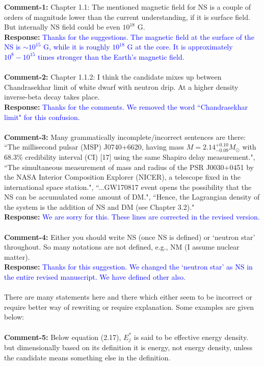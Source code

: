 \documentclass[aps,preprint,showpacs,amsmath,amssymb,prc,floatfix,nofootinbib]{revtex4-1}
\begin{document}
{\bf Comment-1:} Chapter 1.1: The mentioned magnetic field for NS is a couple of orders of magnitude lower than the current understanding, if it is surface field. But internally NS field could be even $10^{18}$ G.
\\
{\bf Response:} \textcolor{blue}{Thanks for the suggestions. The magnetic field at the surface of the NS is $\sim 10^{15}$ G, while it is roughly $10^{18}$ G at the core. It is approximately $10^8-10^{15}$ times stronger than the Earth's magnetic field.}
\\
\\
{\bf Comment-2:} Chapter 1.1.2: I think the candidate mixes up between Chandrasekhar limit of white dwarf with neutron drip. At a higher density inverse-beta decay takes place.
\\
{\bf Response:} \textcolor{blue}{Thanks for the comments. We removed the word ``Chandrasekhar limit" for this confusion.}
\\
\\
{\bf Comment-3:} Many grammatically incomplete/incorrect sentences are there: ``The millisecond pulsar (MSP) J0740+6620, having mass $M = 2.14^{+0.10}
_{-0.09} M_\odot$ with 68.3\% credibility interval (CI) [17] using the same Shapiro delay measurement.", ``The simultaneous measurement of mass and radius of the PSR J0030+0451 by the NASA Interior Composition Explorer (NICER), a telescope fixed in the international space station.", ``...GW170817 event opens the possibility that the NS can be accumulated some amount of DM.", ``Hence, the Lagrangian density of the system is the addition of NS and DM (see Chapter 3.2)."
\\
{\bf Response:} \textcolor{blue}{We are sorry for this. These lines are corrected in the revised version.}
\\
\\
{\bf Comment-4:} Either you should write NS (once NS is defined) or `neutron star' throughout. So many notations are not defined, e.g., NM (I assume nuclear matter). 
\\
{\bf Response:} \textcolor{blue}{Thanks for this suggestion. We changed the `neutron star' as NS in the entire revised manuscript. We have defined other also.}
\\
\\
There are many statements here and there which either seem to be incorrect or require better way of rewriting or require explanation. Some examples are given below:
\\
\\
{\bf Comment-5:} Below equation (2.17), $E_j^*$ is said to be effective energy density. but dimensionally based on its definition it is energy, not energy density, unless the candidate means something else in the definition.
\end{document}
